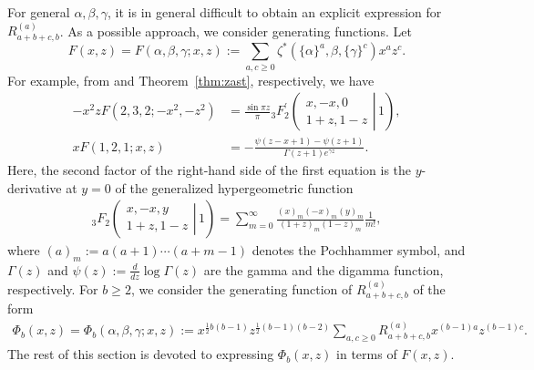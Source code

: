 \documentclass[12pt]{amsart}%
\theoremstyle{definition}
\begin{document}
For general $\alpha,\beta,\gamma$,
it is in general difficult to obtain an explicit expression for $R^{(a)}_{a+b+c,b}$.
As a possible approach, we consider generating functions. 
Let
\[
 F(x,z)=F(\alpha,\beta,\gamma;x,z)
:=\sum_{a,c\ge 0}\zeta^{\ast}(\{\alpha\}^a,\beta,\{\gamma\}^c)x^az^c.
\]
For example, from \cite[Proposition 1]{z12} and 
Theorem~\ref{thm:zast}, respectively, we have
\begin{align*}
-x^2zF(2,3,2;-x^2,-z^2)
&=\frac{\sin\pi z}{\pi}
{}_3F_{2}^{\prime}
\left(\left.\begin{array}{c}
x,-x, 0\\
1+z, 1-z
\end{array} \right\rvert\, 1\right),\\
xF(1,2,1;x,z)
&=-\frac{\psi(z-x+1)-\psi(z+1)}{\Gamma(z+1)e^{\gamma z}}.
\end{align*}
Here, the second factor of the right-hand side of the first equation is the $y$-derivative at $y=0$  of the generalized hypergeometric function 
\begin{align*}
{}_3F_{2}
\left(\left.\begin{array}{c}
x,-x, y\\
1+z, 1-z
\end{array} \right\rvert\, 1\right)
=
\sum_{m=0}^{\infty} \frac{(x)_{m}(-x)_{m}(y)_{m}}{(1+z)_{m}(1-z)_{m}} \frac{1}{m!},
\end{align*}
where $(a)_{m}:=a(a+1) \cdots(a+m-1)$ denotes the Pochhammer symbol,
and $\Gamma(z)$ and $\psi(z):=\frac{d}{dz}\log\Gamma(z)$ are the gamma and the digamma function, respectively. 
For $b\ge 2$, we consider the generating function 
of $R^{(a)}_{a+b+c,b}$ of the form 
\begin{align*}
\Phi_b(x,z)=\Phi_b(\alpha,\beta,\gamma;x,z)
:=x^{\frac{1}{2}b(b-1)}z^{\frac{1}{2}(b-1)(b-2)}
\sum_{a,c\ge 0}R^{(a)}_{a+b+c,b}x^{(b-1)a}z^{(b-1)c}.
\end{align*}
The rest of this section is devoted to expressing $\Phi_b(x,z)$ in terms of $F(x,z)$.
\end{document}
